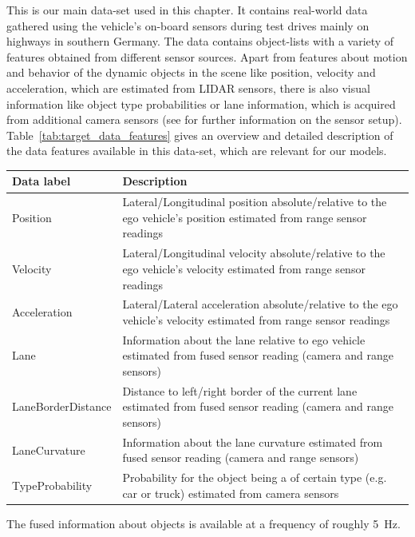 This is our main data-set used in this chapter.
It contains real-world data gathered using the vehicle's on-board sensors during test drives mainly on highways in southern Germany.
The data contains object-lists with a variety of features obtained from different sensor sources.
Apart from features about motion and behavior of the dynamic objects in the scene like position, velocity and acceleration, which are estimated from \ac{LIDAR} sensors, there is also visual information like object type probabilities or lane information, which is acquired from additional camera sensors (see \cite{Aeberhard2015} for further information on the sensor setup).
Table~\ref{tab:target_data_features} gives an overview and detailed description of the data features available in this data-set, which are relevant for our models.
\begin{center}
	\begin{tabular}{|l | p{12cm}|}
		\hline
		\textbf{Data label} & \textbf{Description}\\ \hline
		Position & Lateral/Longitudinal position absolute/relative to the ego vehicle's position estimated from range sensor readings \\ \hline
		Velocity& Lateral/Longitudinal velocity absolute/relative to the ego vehicle's velocity estimated from range sensor readings \\ \hline
		Acceleration & Lateral/Lateral acceleration absolute/relative to the ego vehicle's velocity estimated from range sensor readings \\ \hline
		Lane & Information about the lane relative to ego vehicle estimated from fused sensor reading (camera and range sensors) \\ \hline
		LaneBorderDistance & Distance to left/right border of the current lane estimated from fused sensor reading (camera and range sensors) \\ \hline
		LaneCurvature & Information about the lane curvature estimated from fused sensor reading (camera and range sensors) \\ \hline
		TypeProbability & Probability for the object being a of certain type (e.g. car or truck) estimated from camera sensors \\ \hline
	\end{tabular}
	\label{tab:target_data_features}
\end{center}
The fused information about objects is available at a frequency of roughly \SI{5}{\hertz}.
